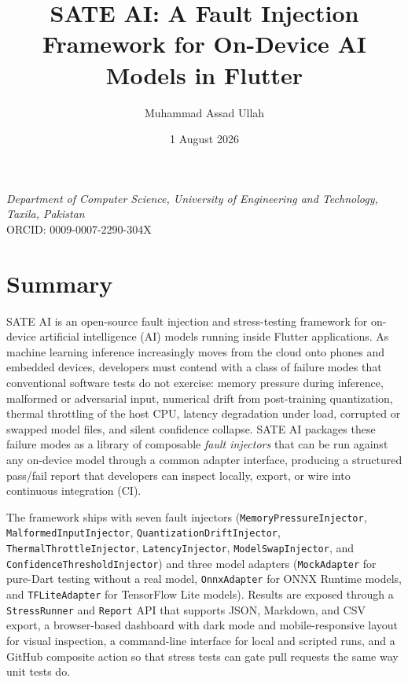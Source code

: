 \documentclass[
  11pt,
]{article}
\title{SATE AI: A Fault Injection Framework for On-Device AI Models in
Flutter}
\author{Muhammad Assad Ullah}
\date{1 August 2026}
\begin{document}
\maketitle

\begin{center}
\textit{Department of Computer Science, University of Engineering and Technology, Taxila, Pakistan}\\
ORCID: 0009-0007-2290-304X
\end{center}

\vspace{0.5em}

\hypertarget{summary}{%
\section{Summary}\label{summary}}

SATE AI is an open-source fault injection and stress-testing framework
for on-device artificial intelligence (AI) models running inside Flutter
applications. As machine learning inference increasingly moves from the
cloud onto phones and embedded devices, developers must contend with a
class of failure modes that conventional software tests do not exercise:
memory pressure during inference, malformed or adversarial input,
numerical drift from post-training quantization, thermal throttling of
the host CPU, latency degradation under load, corrupted or swapped model
files, and silent confidence collapse. SATE AI packages these failure
modes as a library of composable \emph{fault injectors} that can be run
against any on-device model through a common adapter interface,
producing a structured pass/fail report that developers can inspect
locally, export, or wire into continuous integration (CI).

The framework ships with seven fault injectors
(\texttt{MemoryPressureInjector}, \texttt{MalformedInputInjector},
\texttt{QuantizationDriftInjector}, \texttt{ThermalThrottleInjector},
\texttt{LatencyInjector}, \texttt{ModelSwapInjector}, and
\texttt{ConfidenceThresholdInjector}) and three model adapters
(\texttt{MockAdapter} for pure-Dart testing without a real model,
\texttt{OnnxAdapter} for ONNX Runtime models, and \texttt{TFLiteAdapter}
for TensorFlow Lite models). Results are exposed through a
\texttt{StressRunner} and \texttt{Report} API that supports JSON,
Markdown, and CSV export, a browser-based dashboard with dark mode and
mobile-responsive layout for visual inspection, a command-line interface
for local and scripted runs, and a GitHub composite action so that
stress tests can gate pull requests the same way unit tests do.
\end{document}
